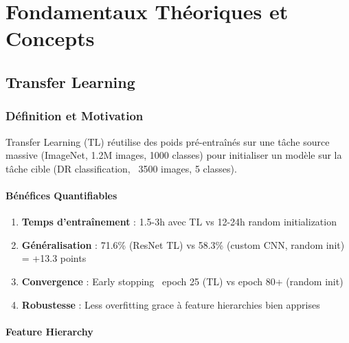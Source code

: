 \documentclass[12pt,a4paper,oneside]{report}
\begin{document}
\newpage


\chapter{Fondamentaux Théoriques et Concepts}

\section{Transfer Learning}

\subsection{Définition et Motivation}

Transfer Learning (TL) réutilise des poids pré-entraînés sur une tâche 
source massive (ImageNet, 1.2M images, 1000 classes) pour initialiser 
un modèle sur la tâche cible (DR classification, ~3500 images, 5 classes).

\subsubsection{Bénéfices Quantifiables}

\begin{enumerate}
    \item \textbf{Temps d'entraînement} : 1.5-3h avec TL vs 12-24h 
          random initialization
    \item \textbf{Généralisation} : 71.6\% (ResNet TL) vs 58.3\% 
          (custom CNN, random init) = +13.3 points
    \item \textbf{Convergence} : Early stopping ~epoch 25 (TL) vs 
          epoch 80+ (random init)
    \item \textbf{Robustesse} : Less overfitting grace à 
          feature hierarchies bien apprises
\end{enumerate}

\subsubsection{Feature Hierarchy}
\end{document}
